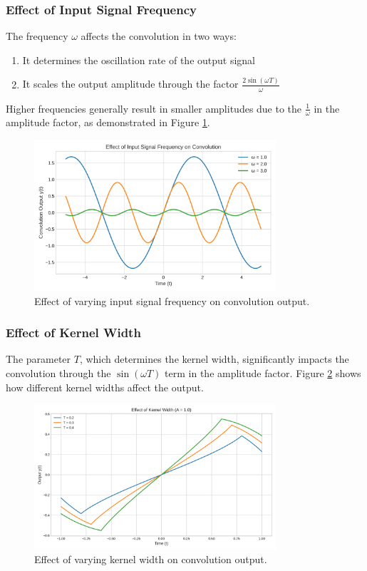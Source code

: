 \subsubsection{Effect of Input Signal Frequency}
The frequency $\omega$ affects the convolution in two ways:
\begin{enumerate}
    \item It determines the oscillation rate of the output signal
    \item It scales the output amplitude through the factor $\frac{2\sin(\omega T)}{\omega}$
\end{enumerate}

Higher frequencies generally result in smaller amplitudes due to the $\frac{1}{\omega}$ in the amplitude factor, as demonstrated in Figure \ref{fig:frequency}.

\begin{figure}[H]
    \centering
    \includegraphics[width=0.8\textwidth]{codes/codes_sin_1_and_arcsin/figures/frequency_effect.png}
    \caption{Effect of varying input signal frequency on convolution output.}
    \label{fig:frequency}
\end{figure}

\subsubsection{Effect of Kernel Width}
The parameter $T$, which determines the kernel width, significantly impacts the convolution through the $\sin(\omega T)$ term in the amplitude factor. Figure \ref{fig:kernel} shows how different kernel widths affect the output.

\begin{figure}[H]
    \centering
    \includegraphics[width=0.8\textwidth]{codes/codes_sin_1_and_arcsin/figures/kernel_width_effect.png}
    \caption{Effect of varying kernel width on convolution output.}
    \label{fig:kernel}
\end{figure}


